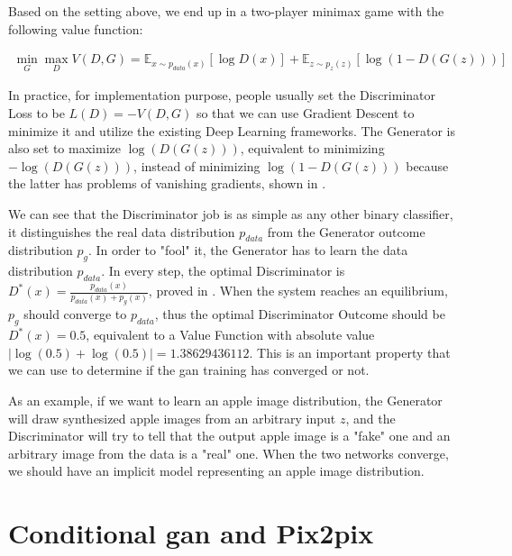 Based on the setting above, we end up in a two-player minimax game with the 
following value function:

\begin{align*}
	\min_{G} \max_{D} V(D, G) = \mathbb{E}_{x \sim p_{data}(x)} [\log D(x)] +
	\mathbb{E}_{z \sim p_z(z)}[\log(1 - D(G(z)))]
\end{align*}

In practice, for implementation purpose, people usually set the Discriminator Loss to be
$L(D) = -V(D, G)$ so that we can use Gradient Descent to minimize it and utilize the
existing Deep Learning frameworks. The Generator is also set to maximize $\log(D(G(z)))$,
equivalent to minimizing $-\log(D(G(z)))$, instead of minimizing $\log(1 - D(G(z)))$
because the latter has problems of vanishing gradients, shown in \cite{gan}.

We can see that the Discriminator job is as simple as any other binary classifier, it
distinguishes the real data distribution $p_{data}$ from the Generator outcome
distribution $p_{g}$. In order to "fool" it, the Generator has to learn the data
distribution $p_{data}$. In every step, the optimal Discriminator is $D^{*}(x) =
\frac{p_{data}(x)}{p_{data}(x) + p_{g}(x)}$, proved in \cite{gan}. When the system reaches
an equilibrium, $p_{g}$ should converge to $p_{data}$, thus the optimal Discriminator
Outcome should be $D^*(x) = 0.5$, equivalent to a Value Function with absolute value
$|\log(0.5)+ \log(0.5)| = 1.38629436112$. This is an important property that we can use to
determine if the \acrshort{gan} training has converged or not.

As an example, if we want to learn an apple image distribution, the Generator will draw
synthesized apple images from an arbitrary input $z$, and the Discriminator will try to tell
that the output apple image is a "fake" one and an arbitrary image from the data is a "real"
one. When the two networks converge, we should have an implicit model representing an apple
image distribution.

\section{Conditional \acrshort{gan} and Pix2pix}

